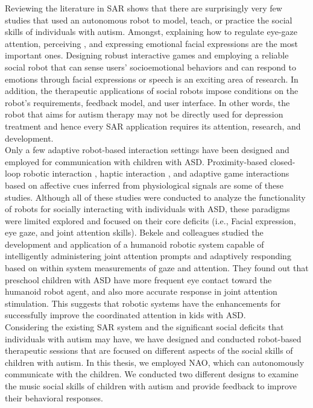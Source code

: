 Reviewing the literature in SAR \cite{feil2005defining, fong2003survey} shows that there are surprisingly very few
studies that used an autonomous robot to model, teach, or practice the social skills of
individuals with autism. Amongst, explaining how to regulate eye-gaze attention, perceiving
, and expressing emotional facial expressions are the most important ones. Designing robust
interactive games and employing a reliable social robot that can sense users’ socioemotional
behaviors and can respond to emotions through facial expressions or speech is
an exciting area of research. In addition, the therapeutic applications of social robots
impose conditions on the robot’s requirements, feedback model, and user interface. In other
words, the robot that aims for autism therapy may not be directly used for depression
treatment and hence every SAR application requires its attention, research, and
development.\\
 
Only a few adaptive robot-based interaction settings have been designed and
employed for communication with children with ASD. Proximity-based closed-loop
robotic interaction \cite{LookApproach1972}, haptic interaction \cite{DiffEffect1966}, and adaptive game interactions based on
affective cues inferred from physiological signals \cite{SysObserv1968} are some of these studies. Although
all of these studies were conducted to analyze the functionality of robots for socially interacting with individuals 
with ASD, these paradigms were limited explored and
focused on their core deficits (i.e., Facial expression, eye gaze, and joint attention skills).
Bekele and colleagues \cite{AutisticDist1943} studied the development and application of a humanoid
robotic system capable of intelligently administering joint attention prompts and adaptively
responding based on within system measurements of gaze and attention. They found out
that preschool children with ASD have more frequent eye contact toward the humanoid
robot agent, and also more accurate response in joint attention stimulation. This suggests
that robotic systems have the enhancements for successfully improve the coordinated
attention in kids with ASD.\\

Considering the existing SAR system and the significant social deficits that individuals
with autism may have, we have designed and conducted robot-based therapeutic sessions
that are focused on different aspects of the social skills of children with autism. In this thesis,
we employed NAO, which can autonomously communicate with the children.
We conducted two different designs to examine the music social skills of children with autism
and provide feedback to improve their behavioral responses. \\

